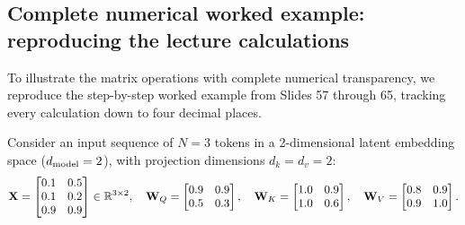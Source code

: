 \documentclass[../../main.tex]{subfiles}
\begin{document}
\subsection{Complete numerical worked example: reproducing the lecture calculations}
\label{subsec:numerical_worked_walkthrough_ch5}

To illustrate the matrix operations with complete numerical transparency, we reproduce the step-by-step worked example from Slides 57 through 65, tracking every calculation down to four decimal places.

Consider an input sequence of $N = 3$ tokens in a 2-dimensional latent embedding space ($d_{\text{model}} = 2$), with projection dimensions $d_k = d_v = 2$:
\begin{equation}
\label{eq:numerical_example_inputs}
\mathbf{X} = \begin{bmatrix}
0.1 & 0.5 \\
0.1 & 0.2 \\
0.9 & 0.9
\end{bmatrix} \in \mathbb{R}^{3 \times 2}, \quad
\mathbf{W}_Q = \begin{bmatrix}
0.9 & 0.9 \\
0.5 & 0.3
\end{bmatrix}, \quad
\mathbf{W}_K = \begin{bmatrix}
1.0 & 0.9 \\
1.0 & 0.6
\end{bmatrix}, \quad
\mathbf{W}_V = \begin{bmatrix}
0.8 & 0.9 \\
0.9 & 1.0
\end{bmatrix}.
\end{equation}
\end{document}
